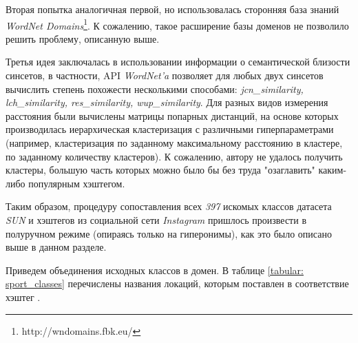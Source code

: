 \indent
\indent
Вторая попытка аналогичная первой, но использовалась сторонняя база знаний
\textit{WordNet Domains}\footnote{http://wndomains.fbk.eu/}. К сожалению, такое
расширение базы доменов не позволило решить проблему, описанную выше.


\indent
\indent
Третья идея заключалась в использовании информации о семантической близости 
синсетов, в частности, API \textit{WordNet'a} позволяет для любых двух синсетов
вычислить степень похожести несколькими способами:
\textit{jcn\_similarity, lch\_similarity, res\_similarity, wup\_similarity}.
Для разных видов измерения расстояния были вычислены матрицы попарных дистанций,
на основе которых производилась иерархическая кластеризация с различными
гиперпараметрами
 (например, кластеризация по заданному максимальному расстоянию в кластере, 
по заданному количеству кластеров). К сожалению, автору не удалось получить кластеры,
большую часть которых можно было бы без труда "озаглавить" 
каким-либо популярным хэштегом.


\indent
\indent
Таким образом, процедуру сопоставления всех 
\textit{397} искомых классов датасета \textit{SUN} и хэштегов из социальной сети \textit{Instagram}
пришлось произвести в полуручном режиме (опираясь только на гиперонимы),
как это было описано выше в данном разделе.


\indent
\indent
Приведем объединения исходных классов в домен. В таблице \ref{tabular: sport_classes} 
перечислены названия локаций, которым поставлен в соответствие хэштег .

